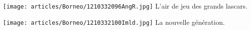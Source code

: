 \begin{multicols}{2}
\hspace*{-0.65cm}
\texttt{[image: articles/Borneo/1210332096AngR.jpg]}
L'air de jeu des grands lascars.

\hspace*{-0.65cm}
\texttt{[image: articles/Borneo/1210332100Imld.jpg]}
La nouvelle génération.


\end{multicols}



